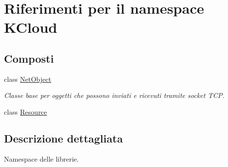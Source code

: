 \hypertarget{namespace_k_cloud}{\section{Riferimenti per il namespace K\-Cloud}
\label{namespace_k_cloud}
}
\subsection*{Composti}
\begin{DoxyCompactItemize}
\item 
class \hyperlink{class_k_cloud_1_1_net_object}{Net\-Object}
\begin{DoxyCompactList}\small\item\em Classe base per oggetti che possono inviati e ricevuti tramite socket T\-C\-P. \end{DoxyCompactList}\item 
class \hyperlink{class_k_cloud_1_1_resource}{Resource}
\end{DoxyCompactItemize}


\subsection{Descrizione dettagliata}
Namespace delle librerie. 
